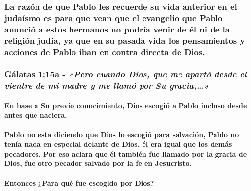 \documentclass[11a pt,twoside]{article}
\newcommand{\scripture}[1]{%
  {\fontsize{12pt}{16pt}\selectfont\ScriptureFont\itshape #1}%
}
\let\oldsubsubsection\subsubsection
\renewcommand{\subsubsection}{\needspace{4\baselineskip}\oldsubsubsection}
\let\oldparagraph\paragraph
\renewcommand{\paragraph}{\needspace{3\baselineskip}\oldparagraph}
\begin{document}
\subsubsection{La razón de que Pablo les recuerde su vida anterior en el
judaísmo es para que vean que el evangelio que Pablo anunció a estos
hermanos no podría venir de él ni de la religión judía, ya que en su
pasada vida los pensamientos y acciones de Pablo iban en contra directa
de
Dios.}\label{la-razuxf3n-de-que-pablo-les-recuerde-su-vida-anterior-en-el-judauxedsmo-es-para-que-vean-que-el-evangelio-que-pablo-anunciuxf3-a-estos-hermanos-no-podruxeda-venir-de-uxe9l-ni-de-la-religiuxf3n-juduxeda-ya-que-en-su-pasada-vida-los-pensamientos-y-acciones-de-pablo-iban-en-contra-directa-de-dios.}

\subsubsection{\texorpdfstring{Gálatas 1:15a -
\scripture{«Pero cuando Dios, que me apartó desde el vientre de mi madre y me llamó por Su gracia,…»}}{Gálatas 1:15a - }}\label{guxe1latas-115a---pero-cuando-dios-que-me-apartuxf3-desde-el-vientre-de-mi-madre-y-me-llamuxf3-por-su-gracia}

\paragraph{En base a Su previo conocimiento, Dios escogió a Pablo
incluso desde antes que
naciera.}\label{en-base-a-su-previo-conocimiento-dios-escogiuxf3-a-pablo-incluso-desde-antes-que-naciera.}

\paragraph{Pablo no esta diciendo que Dios lo escogió para salvación,
Pablo no tenía nada en especial delante de Dios, él era igual que los
demás pecadores. Por eso aclara que él también fue llamado por la gracia
de Dios, fue otro pecador salvado por la fe en
Jesucristo.}\label{pablo-no-esta-diciendo-que-dios-lo-escogiuxf3-para-salvaciuxf3n-pablo-no-tenuxeda-nada-en-especial-delante-de-dios-uxe9l-era-igual-que-los-demuxe1s-pecadores.-por-eso-aclara-que-uxe9l-tambiuxe9n-fue-llamado-por-la-gracia-de-dios-fue-otro-pecador-salvado-por-la-fe-en-jesucristo.}

\paragraph{Entonces ¿Para qué fue escogido por
Dios?}\label{entonces-para-quuxe9-fue-escogido-por-dios}
\end{document}
